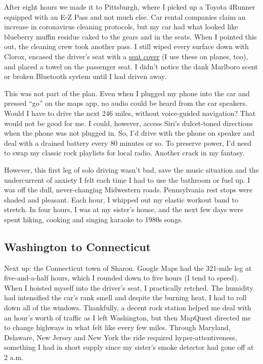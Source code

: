 After eight hours we made it to Pittsburgh, where I picked up a Toyota
4Runner equipped with an E-Z Pass and not much else. Car rental
companies claim an increase in coronavirus cleaning protocols, but my
car had what looked like blueberry muffin residue caked to the gears and
in the seats. When I pointed this out, the cleaning crew took another
pass. I still wiped every surface down with Clorox, encased the driver's
seat with a \href{https://seatsitters.com/}{seat cover} (I use these on
planes, too), and placed a towel on the passenger seat. I didn't notice
the dank Marlboro scent or broken Bluetooth system until I had driven
away.

This was not part of the plan. Even when I plugged my phone into the car
and pressed ``go'' on the maps app, no audio could be heard from the car
speakers. Would I have to drive the next 246 miles, without voice-guided
navigation? That would not be good for me. I could, however, access
Siri's dulcet-toned directions when the phone was not plugged in. So,
I'd drive with the phone on speaker and deal with a drained battery
every 80 minutes or so. To preserve power, I'd need to swap my classic
rock playlists for local radio. Another crack in my fantasy.

However, this first leg of solo driving wasn't bad, save the music
situation and the undercurrent of anxiety I felt each time I had to use
the bathroom or fuel up. I was off the dull, never-changing Midwestern
roads. Pennsylvania rest stops were shaded and pleasant. Each hour, I
whipped out my elastic workout band to stretch. In four hours, I was at
my sister's house, and the next few days were spent hiking, cooking and
singing karaoke to 1980s songs.

\hypertarget{washington-to-connecticut}{%
\subsection{Washington to Connecticut}\label{washington-to-connecticut}}

Next up: the Connecticut town of Sharon. Google Maps had the 321-mile
leg at five-and-a-half hours, which I rounded down to five hours (I tend
to speed). When I hoisted myself into the driver's seat, I practically
retched. The humidity had intensified the car's rank smell and despite
the burning heat, I had to roll down all of the windows. Thankfully, a
decent rock station helped me deal with an hour's worth of traffic as I
left Washington, but then MapQuest directed me to change highways in
what felt like every few miles. Through Maryland, Delaware, New Jersey
and New York the ride required hyper-attentiveness, something I had in
short supply since my sister's smoke detector had gone off at 2 a.m.

